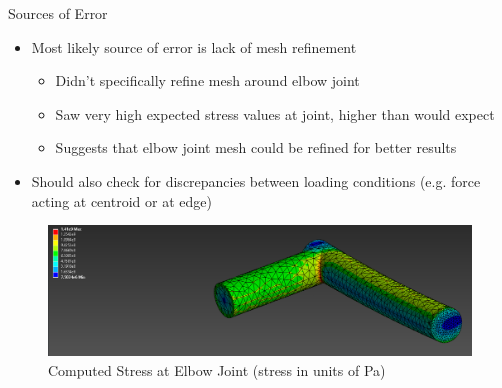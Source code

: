 \documentclass[11pt]{beamer}
\begin{document}
    \begin{frame}{Sources of Error}
        \begin{itemize} 
            \item Most likely source of error is lack of mesh refinement
            \begin{itemize}
                \item Didn't specifically refine mesh around elbow joint
                \item Saw very high expected stress values at joint, higher than would expect
                \item Suggests that elbow joint mesh could be refined for better results
            \end{itemize}
            \item Should also check for discrepancies between loading conditions (e.g. force acting at centroid or at edge)
        \end{itemize}

        \begin{figure} 
            \includegraphics[scale=0.25]{figs/3E-3_Body_1E-3_Face/von_mises_eq_stress_better_view_cropped.png}
            \vspace{-7pt}
            \caption{Computed Stress at Elbow Joint (stress in units of Pa)}
        \end{figure}
    \end{frame}
\end{document}

